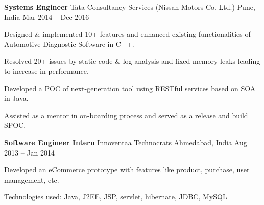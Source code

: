 \documentclass[]{awesome-cv}
\begin{document}
\vspace{-7mm}
\begin{cventries}
	\cventry
	{\textbf{Systems Engineer}}
	{Tata Consultancy Services (Nissan Motors Co. Ltd.)}
	{Pune, India}
	{Mar 2014 – Dec 2016}
	{
	\vspace{1mm}
	\begin{cvresponsiblties}
		\item {Designed \& implemented 10+ features and enhanced existing functionalities of Automotive Diagnostic Software in C++.}
		\item {Resolved 20+ issues by static-code \& log analysis and fixed memory leaks leading to increase in performance.}
		\item {Developed a POC of next-generation tool using RESTful services based on SOA in Java.}
		\item {Assisted as a mentor in on-boarding process and served as a release and build SPOC.}
	\end{cvresponsiblties}
	\vspace{-2mm}
	}
	\cventry
	{\textbf{Software Engineer Intern}}
	{Innoventaa Technocrats}
	{Ahmedabad, India}
	{Aug 2013 – Jan 2014}
	{
	\vspace{1mm}
	\begin{cvresponsiblties}
		\item {Developed an eCommerce prototype with features like product, purchase, user management, etc.}
		\item {Technologies used: Java, J2EE, JSP, servlet, hibernate, JDBC, MySQL}
		\end{cvresponsiblties}
	}
\end{cventries}
\vspace{-5.5mm}
\vspace{-4mm}
\end{document}
